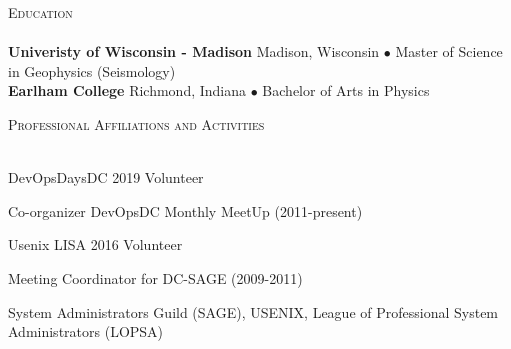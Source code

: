 \documentclass{article}
\newcommand{\lineunder}{\vspace*{-8pt} \\ \hspace*{-18pt} \hrulefill \\}
\newcommand{\header}[1]{{\hspace*{-15pt}\vspace*{6pt} \textsc{#1}} \vspace*{-6pt} \lineunder}
\newenvironment{achievements}{\begin{list}{\topsep 0pt \itemsep -2pt}} {\vspace*{4pt}\end{list}}
\newcommand{\school}[3]{
 \textbf{#1} #2 $\bullet$ #3\\
}
\begin{document}
\header{Education}

\school{Univeristy of Wisconsin - Madison}{Madison, Wisconsin} {Master of Science in Geophysics (Seismology)}
\school{Earlham College}{Richmond, Indiana}{Bachelor of Arts in Physics}
\vspace{18pt}

\header{Professional Affiliations and Activities}
\begin{achievements}
\item DevOpsDaysDC 2019 Volunteer
\item Co-organizer DevOpsDC Monthly MeetUp (2011-present)
\item Usenix LISA 2016 Volunteer
\item Meeting Coordinator for DC-SAGE (2009-2011)
\item System Administrators Guild (SAGE), USENIX, League of Professional System Administrators (LOPSA)
\end{achievements}


\end{document}
